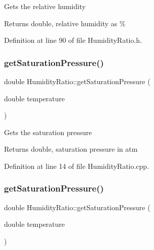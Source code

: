 Gets the relative humidity

\begin{DoxyReturn}{Returns}
double, relative humidity as \% 
\end{DoxyReturn}


Definition at line 90 of file Humidity\+Ratio.\+h.

\mbox{\label{class_humidity_ratio_a29d3152c2f14fd47f9ee34c0787049cf}} 
\subsubsection{\texorpdfstring{get\+Saturation\+Pressure()}{getSaturationPressure()}\hspace{0.1cm}{\footnotesize\ttfamily [1/3]}}
{\footnotesize\ttfamily double Humidity\+Ratio\+::get\+Saturation\+Pressure (\begin{DoxyParamCaption}\item[{double}]{temperature }\end{DoxyParamCaption})}

Gets the saturation pressure

\begin{DoxyReturn}{Returns}
double, saturation pressure in atm 
\end{DoxyReturn}


Definition at line 14 of file Humidity\+Ratio.\+cpp.

\mbox{\label{class_humidity_ratio_a29d3152c2f14fd47f9ee34c0787049cf}} 
\subsubsection{\texorpdfstring{get\+Saturation\+Pressure()}{getSaturationPressure()}\hspace{0.1cm}{\footnotesize\ttfamily [2/3]}}
{\footnotesize\ttfamily double Humidity\+Ratio\+::get\+Saturation\+Pressure (\begin{DoxyParamCaption}\item[{double}]{temperature }\end{DoxyParamCaption})}

